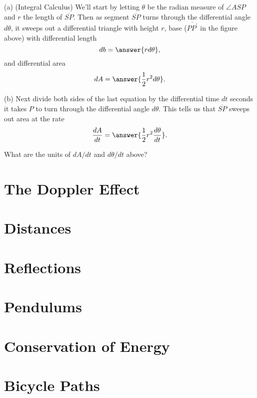 \documentclass{ximera}
\begin{document}
\begin{question}  \label{Qdf4t5tht5544}
(a) (Integral Calculus) We'll start by letting $\theta$ be the radian measure of $\angle ASP$ and $r$ the length of $\overline{SP}$. Then as segment $\overline{SP}$ turns through the differential angle $d\theta$, it sweeps out
a differential triangle with height $r$, base ($\overline{PP^\prime}$ in the figure above) with differential length
\[
             db = \answer{r d\theta},
\]
and differential area
\[
    dA = \answer{\frac{1}{2}r^2 d\theta} .
\]

(b) Next divide both sides of the last equation by the differential time $dt$ seconds it takes $P$ to turn through the differential angle $d\theta$. This tells us that $\overline{SP}$ sweeps out area at the rate
\[
  \frac{dA}{dt} = \answer{\frac{1}{2}r^2 \frac{d\theta}{dt}} .
\]

\begin{freeResponse}
What are the units of $dA/dt$ and $d\theta/dt$ above?
\end{freeResponse}

\end{question}


\section*{The Doppler Effect}


\section*{Distances}


\section*{Reflections}


\section*{Pendulums}


\section*{Conservation of Energy}


\section*{Bicycle Paths}
\end{document}
